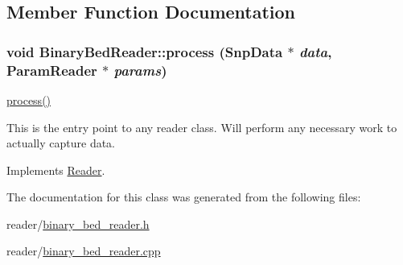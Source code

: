 \subsection{Member Function Documentation}
\hypertarget{classBinaryBedReader_a2132af8b71a683550c19ec4ac3ec3db2}{
\subsubsection[{process}]{\setlength{\rightskip}{0pt plus 5cm}void BinaryBedReader::process ({\bf SnpData} $\ast$ {\em data}, \/  {\bf ParamReader} $\ast$ {\em params})}}
\label{classBinaryBedReader_a2132af8b71a683550c19ec4ac3ec3db2}
\hyperlink{classBinaryBedReader_a2132af8b71a683550c19ec4ac3ec3db2}{process()}

This is the entry point to any reader class. Will perform any necessary work to actually capture data. 

Implements \hyperlink{classReader_a334a724f607c84262af67759ffcdbd26}{Reader}.



The documentation for this class was generated from the following files:\begin{DoxyCompactItemize}
\item 
reader/\hyperlink{binary__bed__reader_8h}{binary\_\-bed\_\-reader.h}\item 
reader/\hyperlink{binary__bed__reader_8cpp}{binary\_\-bed\_\-reader.cpp}\end{DoxyCompactItemize}

